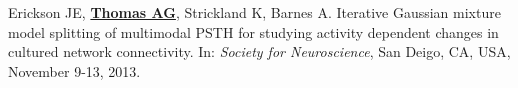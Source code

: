 \documentclass[10pt]{article}
\makeatletter
\newlength{\bibhang}
\newlength{\bibsep}
 {\@listi \global\bibsep\itemsep \global\advance\bibsep by\parsep}
\newenvironment{bibenum*}
  {\renewcommand\labelenumi{[\theenumi]}%
   \etaremune[
     topsep=0pt,
     itemsep=\bibsep,
     parsep=0pt,partopsep=0pt,
     itemindent=-\bibhang,
     leftmargin={\bibhang+\widthof{[999]}}]}
  {\endetaremune}
\makeatother
\begin{document}
\begin{bibenum*}


\item Erickson JE\dag, \underline{\textbf{Thomas AG}\dag}, Strickland K, Barnes A.
  Iterative Gaussian mixture model splitting
  of multimodal PSTH for studying activity dependent changes in
  cultured network connectivity. In: \emph{Society for Neuroscience},
  San Deigo, CA, USA, November 9-13, 2013.

\end{bibenum*}
\end{document}
